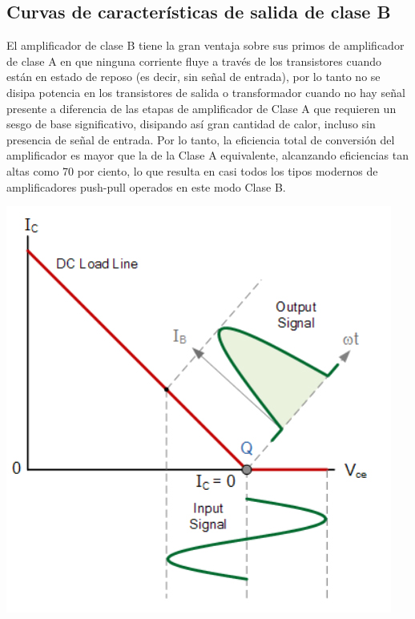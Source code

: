 \documentclass[12pt,a4paper]{article}
\begin{document}
\begin{flushleft}
\subsection{Curvas de características de salida de clase B}
El amplificador de clase B tiene la gran ventaja sobre sus primos de amplificador de clase A en que ninguna corriente fluye a través de los transistores cuando están en estado de reposo (es decir, sin señal de entrada), por lo tanto no se disipa potencia en los transistores de salida o transformador cuando no hay señal presente a diferencia de las etapas de amplificador de Clase A que requieren un sesgo de base significativo, disipando así gran cantidad de calor, incluso sin presencia de señal de entrada.
\linebreak
\linebreak
Por lo tanto, la eficiencia total de conversión del amplificador es mayor que la de la Clase A equivalente, alcanzando eficiencias tan altas como 70 por ciento, lo que resulta en casi todos los tipos modernos de amplificadores push-pull operados en este modo Clase B.
\linebreak
\linebreak
\end{flushleft}
\begin{center}
\includegraphics[scale=.6]{imagenes/transformador.JPG}
\end{center}
\newpage 
\end{document}
